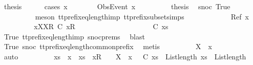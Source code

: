 \begin{isabellebody}
\ {\isacharquery}thesis\isanewline
\ \ \ \ \isamarkupfalse%
\ {\isacharparenleft}cases\ x{\isacharparenright}\isanewline
\ \ \ \ \ \ \isamarkupfalse%
\ {\isacharparenleft}ObsEvent\ x{}{\isacharparenright}\isanewline
\ \ \ \ \ \ \isamarkupfalse%
\ \isamarkupfalse%
\ {\isacharquery}thesis\ \isamarkupfalse%
\ snoc\ True\isanewline
\ \ \ \ \ \ \ \ \isamarkupfalse%
\ {\isacharparenleft}meson\ tt{\isacharunderscore}prefix{\isacharunderscore}eq{\isacharunderscore}length{\isacharunderscore}imp\ tt{\isacharunderscore}prefix{\isacharunderscore}subset{\isachardot}simps{\isacharparenleft}{}{\isacharparenright}{\isacharparenright}\isanewline
\ \ \ \ \isamarkupfalse%
\isanewline
\ \ \ \ \ \ \isamarkupfalse%
\ {\isacharparenleft}Ref\ x{}{\isacharparenright}\isanewline
\ \ \ \ \ \ \isamarkupfalse%
\ \isamarkupfalse%
\ xX{}{\isacharcolon}{\isachardoublequoteopen}{\isacharbrackleft}{\isacharbrackleft}X{\isacharbrackright}\isactrlsub R{\isacharbrackright}\ {\isasymlesssim}\isactrlsub C\ {\isacharbrackleft}{\isacharbrackleft}x{}{\isacharbrackright}\isactrlsub R{\isacharbrackright}{\isachardoublequoteclose}\isanewline
\ \ \ \ \ \ \ \ \ \ \ \ \ \ \ \ \ \ \ \ {\isachardoublequoteopen}{\isasymrho}\ {\isasymlesssim}\isactrlsub C\ xs{\isachardoublequoteclose}\isanewline
\ \ \ \ \ \ \ \ \isamarkupfalse%
\ True\ tt{\isacharunderscore}prefix{\isacharunderscore}eq{\isacharunderscore}length{\isacharunderscore}imp\ snoc{\isachardot}prems{\isacharparenleft}{}{\isacharparenright}\ \isamarkupfalse%
\ blast\isanewline
\ \ \ \ \ \ \ \ \isamarkupfalse%
\ True\ snoc\ tt{\isacharunderscore}prefix{\isacharunderscore}eq{\isacharunderscore}length{\isacharunderscore}common{\isacharunderscore}prefix\ \isamarkupfalse%
\ metis\isanewline
\ \ \ \ \ \ \isamarkupfalse%
\ \isamarkupfalse%
\ {\isachardoublequoteopen}X\ {\isasymsubseteq}\ x{}{\isachardoublequoteclose}\ \isanewline
\ \ \ \ \ \ \ \ \isamarkupfalse%
\ auto\isanewline
\ \ \ \ \ \ \isamarkupfalse%
\ \isamarkupfalse%
\ {\isachardoublequoteopen}xs\ {\isacharat}\ {\isacharbrackleft}x{\isacharbrackright}\ {\isacharequal}\ xs\ {\isacharat}\ {\isacharbrackleft}{\isacharbrackleft}x{}{\isacharbrackright}\isactrlsub R{\isacharbrackright}\ {\isacharat}\ {\isacharbrackleft}{\isacharbrackright}\ {\isasymand}\ X\ {\isasymsubseteq}\ x{}\ {\isasymand}\ {\isasymrho}\ {\isasymlesssim}\isactrlsub C\ xs\ {\isasymand}\ List{\isachardot}length\ {\isacharparenleft}xs{\isacharparenright}\ {\isacharequal}\ List{\isachardot}length\ {\isacharparenleft}{\isasymrho}{\isacharparenright}{\isachardoublequoteclose}\isanewline

\end{isabellebody}
